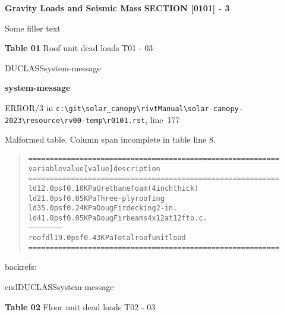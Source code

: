 \documentclass[12pt,notitle,letterpaper]{report}
\newenvironment{DUclass}[1]%
  {%
   \def\DocutilsClassFunctionName{DUCLASS#1}
     \csname \DocutilsClassFunctionName \endcsname}%
  {\csname end\DocutilsClassFunctionName \endcsname}%
\newenvironment{DUadmonition}%
  {\begin{center}
     \begin{lrbox}{\DUadmonitionbox}
       \begin{minipage}{0.9\linewidth}
  }%
  {    \end{minipage}
     \end{lrbox}
     \fbox{\usebox{\DUadmonitionbox}}
   \end{center}
  }
\newenvironment{DUlineblock}[1]{%
    \list{}{\setlength{\partopsep}{\parskip}
            \addtolength{\partopsep}{\baselineskip}
            \setlength{\topsep}{0pt}
            \setlength{\itemsep}{0.15\baselineskip}
            \setlength{\parsep}{0pt}
            \setlength{\leftmargin}{#1}}
    \raggedright
  }
  {\endlist}
\providecommand*{\DUtitle}[1]{%
  \smallskip\noindent\textbf{#1}\smallskip}
\begin{document}
\newpage

\pagebreak

\vspace{.2in}   \textbf{Gravity Loads and Seismic Mass}   \hfill\textbf{SECTION [0101] - 3}
\newline   \vspace{.05in}   {\color{black}\hrulefill}

Some filler text

\begin{DUlineblock}{0em}
\item[] 
\end{DUlineblock}

\textbf{Table 01} Roof unit dead loads \hfill T01 - 03

\begin{DUclass}{system-message}
\begin{DUadmonition}
\DUtitle{system-message
}

{\color{red}ERROR/3} in \texttt{c:\textbackslash{}git\textbackslash{}solar\_canopy\textbackslash{}rivtManual\textbackslash{}solar-canopy-2023\textbackslash{}resource\textbackslash{}rv00-temp\textbackslash{}r0101.rst}, line~177

Malformed table.
Column span incomplete in table line 8.

\begin{quote}
\begin{alltt}
==========  =======  =========  =================================
variable      value    [value]  description
==========  =======  =========  =================================
ld1         2.0 psf   0.10 KPa  Urethane foam (4 inch thick)
ld2         1.0 psf   0.05 KPa  Three-ply roofing
ld3         5.0 psf   0.24 KPa  Doug Fir decking 2-in.
ld4         1.0 psf   0.05 KPa  Doug Fir beams 4x12 at 12 ft o.c.
------       ------     ------  ------
roofdl1     9.0 psf   0.43 KPa  Total roof unit load
==========  =======  =========  =================================
\end{alltt}
\end{quote}
backrefs: \end{DUadmonition}
\end{DUclass}

\begin{DUlineblock}{0em}
\item[] 
\end{DUlineblock}

\textbf{Table 02} Floor unit dead loads \hfill T02 - 03
\end{document}
